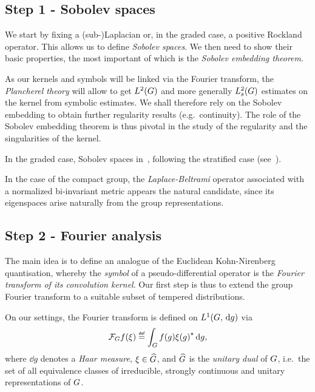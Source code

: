 \subsection*{Step 1 - Sobolev spaces}

We start by fixing a (sub-)Laplacian or, in the graded case, a positive Rockland operator.
This allows us to define \emph{Sobolev spaces}.
We then need to show their basic properties,
the most important of which is the \emph{Sobolev embedding theorem}.

As our kernels and symbols will be linked via the Fourier transform,
the \emph{Plancherel theory} will allow to get ${L^{2} (G)}$ and more generally $L^2_{s}(G)$ estimates on the kernel from symbolic estimates.
We shall therefore rely on the Sobolev embedding to obtain further regularity results (e.g.~continuity).
The role of the Sobolev embedding theorem is thus pivotal in the study of the regularity and the singularities of the kernel.

In the graded case,
Sobolev spaces in~\cite[Chapter 4]{FischerRuzhansky16},
following the stratified case (see~\cite{Folland75}).

In the case of the compact group,
the \emph{Laplace-Beltrami} operator associated with a normalized bi-invariant metric appears the natural candidate,
since its eigenspaces arise naturally from the group representations.

\subsection*{Step 2 - Fourier analysis}

The main idea is to define an analogue of the Euclidean Kohn-Nirenberg quantisation,
whereby the \emph{symbol} of a pseudo-differential operator is the \emph{Fourier transform of its convolution kernel}.
Our first step is thus to extend the group Fourier transform to a suitable subset of tempered distributions.

On our settings,
the Fourier transform is defined on ${L^{1} (G, \,\mathrm{d} g)}$ via
\begin{align*}
    \Fourier f(\xi)
    \defeq \int_\Group f(g) \adj{\xi(g)} \dd g,
\end{align*}
where $\dd g$ denotes a \emph{Haar measure},
$\xi \in {\widehat{G}}$,
and ${\widehat{G}}$ is the \emph{unitary dual} of $G$,
i.e.\ the set of all equivalence classes of irreducible, strongly continuous and unitary representations of $G$.


